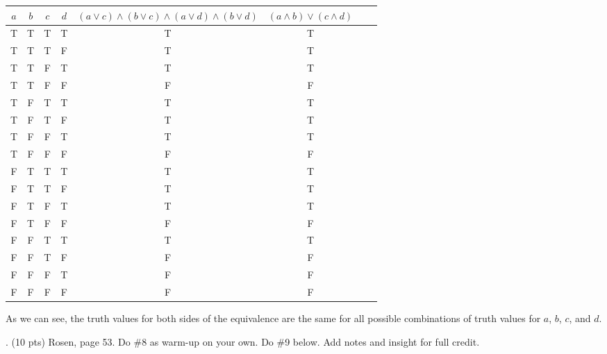 \documentclass{article}
\newcommand{\sectionbreak}{\clearpage}
\begin{document}
\begin{tabular}{|c|c|c|c|c|c|c|c|}
    \hline
    $a$ & $b$ & $c$ & $d$ & $(a \lor c) \land (b \lor c) \land (a \lor d) \land (b \lor d)$ & $(a \land b) \lor (c \land d)$\\
    \hline
    T & T & T & T & T & T \\
    \hline
    T & T & T & F & T & T \\
    \hline
    T & T & F & T & T & T \\
    \hline
    T & T & F & F & F & F \\
    \hline
    T & F & T & T & T & T \\
    \hline
    T & F & T & F & T & T \\
    \hline
    T & F & F & T & T & T \\
    \hline
    T & F & F & F & F & F \\
    \hline
    F & T & T & T & T & T \\
    \hline
    F & T & T & F & T & T \\
    \hline
    F & T & F & T & T & T \\
    \hline
    F & T & F & F & F & F \\
    \hline
    F & F & T & T & T & T \\
    \hline
    F & F & T & F & F & F \\
    \hline
    F & F & F & T & F & F \\
    \hline
    F & F & F & F & F & F \\
    \hline
\end{tabular}
\medbreak
As we can see, the truth values for both sides of the equivalence are the same for all possible combinations of truth values for $a$, $b$, $c$, and $d$.




\sectionbreak
4. (10 pts) Rosen, page 53. Do \#8 as warm-up on your own. Do \#9 below. Add notes
and insight for full credit.
\end{document}
